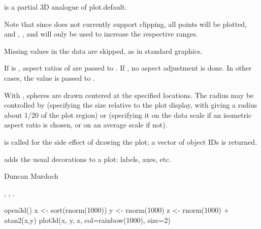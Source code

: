 \begin{Details}\relax
{} is a partial 3D analogue of plot.default.

Note that since  does not currently support
clipping, all points will be plotted, and , , and 
will only be used to increase the respective ranges.

Missing values in the data are skipped, as in standard graphics.

If  is , aspect ratios of  are passed to
.  If , no aspect adjustment is done.  In other
cases, the value is passed to .

With , spheres are drawn centered at the specified locations.
The radius may be controlled by  (specifying the size relative
to the plot display, with  giving a radius 
about 1/20 of the plot region) or  (specifying it on the data scale
if an isometric aspect ratio is chosen, or on an average scale
if not).
\end{Details}
\begin{Value}
 is called for the side effect of drawing the plot; a vector
of object IDs is returned.

 adds the usual decorations to a plot:  labels, axes, etc.
\end{Value}
\begin{Author}\relax
Duncan Murdoch
\end{Author}
\begin{SeeAlso}\relax
{},  
, .
\end{SeeAlso}
\begin{Examples}
\begin{ExampleCode}
  open3d()
  x <- sort(rnorm(1000))
  y <- rnorm(1000)
  z <- rnorm(1000) + atan2(x,y)
  plot3d(x, y, z, col=rainbow(1000), size=2)
\end{ExampleCode}
\end{Examples}

